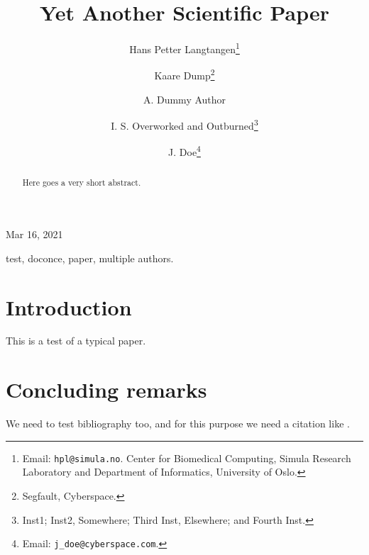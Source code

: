 \documentclass[leqno,final]{siamltex}
\begin{document}

\newcommand{\exercisesection}[1]{\subsection*{#1}}








\title{Yet Another Scientific Paper}


\author{Hans Petter Langtangen\thanks{Email: \texttt{hpl@simula.no}. Center for Biomedical Computing, Simula Research Laboratory and Department of Informatics, University of Oslo.}
\and Kaare Dump\thanks{Segfault, Cyberspace.}
\and A. Dummy Author
\and I. S. Overworked and Outburned\thanks{Inst1; Inst2, Somewhere; Third Inst, Elsewhere; and Fourth Inst.}
\and J. Doe\thanks{Email: \texttt{j\_doe@cyberspace.com}.}}


\begin{center}
Mar 16, 2021
\end{center}

\vspace{1cm}

\begin{abstract}
Here goes
a very short
abstract.
\end{abstract}


\begin{keywords}
test, doconce, paper, multiple authors.
\end{keywords}


\vspace{1cm} %

\section{Introduction}

This is a test of a typical paper.

\section{Concluding remarks}

We need to test bibliography too, and for this purpose we need
a citation like \cite{Langtangen_1992c,Langtangen_1994a}.





\end{document}
